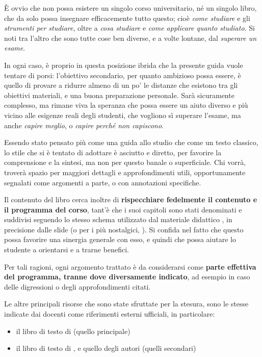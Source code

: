 È ovvio che non possa esistere un singolo corso universitario, né un singolo
libro, che da solo possa insegnare efficacemente tutto questo; cioè
\emph{come studiare} e gli \emph{strumenti per studiare}, oltre a \emph{cosa
studiare} e \emph{come applicare quanto studiato}. Si noti tra l'altro che sono
tutte cose ben diverse, e a volte lontane, dal \emph{superare un esame}.

In ogni caso, è proprio in questa posizione ibrida che la presente guida vuole
tentare di porsi: l'obiettivo secondario, per quanto ambizioso possa essere, è
quello di provare a ridurre almeno di un po' le distanze che esistono tra gli
obiettivi materiali, e una buona preparazione personale. Sarà sicuramente
complesso, ma rimane viva la speranza che possa essere un aiuto diverso e più
vicino alle esigenze reali degli studenti, che vogliono sì superare l'esame, ma
anche \emph{capire meglio}, o \emph{capire perché non capiscono}.

Essendo stato pensato più come una guida allo studio che come un testo classico,
lo stile che si è tentato di adottare è asciutto e diretto, per favorire la
comprensione e la sintesi, ma non per questo banale o superficiale. Chi vorrà,
troverà spazio per maggiori dettagli e approfondimenti utili, opportunamente
segnalati come argomenti a parte, o con annotazioni specifiche.

Il contenuto del libro cerca inoltre di \textbf{rispecchiare fedelmente il
contenuto e il programma del corso}, tant'è che i suoi capitoli sono stati
denominati e suddivisi seguendo lo stesso schema utilizzato dal materiale
didattico \autocite{DispenseElettronica}, in precisione dalle slide (o per i più
nostalgici, ). Si confida nel fatto che questo possa favorire
una sinergia generale con esso, e quindi che possa aiutare lo studente a
orientarsi e a trarne benefici.

Per tali ragioni, ogni argomento trattato è da considerarsi come \textbf{parte
effettiva del programma, tranne dove diversamente indicato}, ad esempio in caso
delle digressioni o degli approfondimenti citati.

Le altre principali risorse che sono state sfruttate per la stesura, sono le
stesse indicate dai docenti come riferimenti esterni ufficiali, in particolare:
\begin{itemize}
\item il libro di testo di \emph{}
\autocite{storey4ed}\autocite{storey6ed} (quello principale)
\item il libro di testo di \emph{} \autocite{floyd}, e quello degli
autori \emph{} \autocite{jaegerblalock} (quelli
secondari)
\end{itemize}

